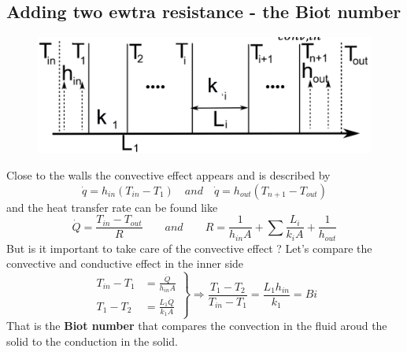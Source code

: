  			\subsection{Adding two ewtra resistance - the Biot number}
 				\label{sec:3.3.3}
 				\begin{figure}
 				\vspace{-5mm}
 				\includegraphics[scale=0.22]{ch3/7}
 				\end{figure}
 				Close to the walls the convective effect appears and is described by 
 				\begin{equation}
 					\dot{q} = h_{in} (T_{in}-T_1) \quad and \quad \dot{q} = h_{out} (T_{n+1} - T_{out})
 				\end{equation}
 				and the heat transfer rate can be found like 
 				\begin{equation}
 					\dot{Q} = \frac{T_{in}-T_{out}}{R} \qquad and \qquad R = \frac{1}{h_{in}A} + \sum \frac{L_i}{k_iA} + \frac{1}{h_{out}}
 				\end{equation}
 				But is it important to take care of the convective effect ? Let's compare the convective and conductive effect in the inner side 
 				\begin{equation}
 					\left. 
 					\begin{aligned}
 					 	T_{in}-T_1 &= \frac{\dot{Q}}{h_{in} A} \\
 					 	T_1 - T_2 &= \frac{L_1\dot{Q}}{k_1A}
 					\end{aligned}
 					\right\} \Rightarrow \frac{T_1-T_2}{T_{in}-T_1} = \frac{L_1h_{in}}{k_1} = Bi
 				\end{equation}
 				That is the \textbf{Biot number} that compares the convection in the fluid aroud the solid to the conduction in the solid.
 			
